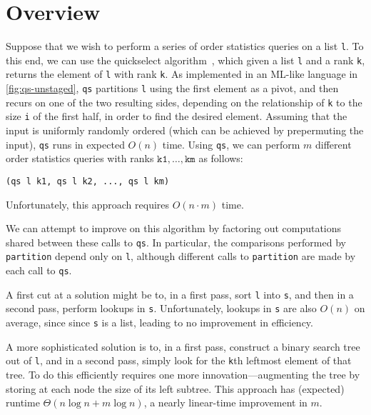 
\section{Overview}
\label{sec:overview}

\begin{abstrsyn}



Suppose that we wish to perform a series of order statistics queries
on a list \texttt{l}. To this end, we can use the quickselect
algorithm~\cite{Hoare:1961}, which given a list \texttt{l} and a rank
\texttt{k}, returns the element of \texttt{l} with rank \texttt{k}.
As implemented in an ML-like language in \ref{fig:qs-unstaged},
\texttt{qs} partitions \texttt{l} using the first element as
a pivot, and then recurs on one of the two resulting sides, depending on
the relationship of \texttt{k} to the size \texttt{i} of the first half, in
order to find the desired element.  Assuming that the input is uniformly
randomly ordered (which can be achieved by prepermuting the input), \texttt{qs}
runs in expected $O(n)$ time.
%
Using \texttt{qs}, we can perform $m$ different order statistics queries with
ranks $\mathtt{k1},\dots,\mathtt{km}$ as follows:
%
\begin{lstlisting}
(qs l k1, qs l k2, ..., qs l km)
\end{lstlisting}
%
Unfortunately, this approach requires $O(n \cdot m)$ time.

We can attempt to improve on this algorithm by factoring out computations shared
between these calls to \texttt{qs}. In particular, the comparisons performed by
\texttt{partition} depend only on \texttt{l}, although different calls to
\texttt{partition} are made by each call to \texttt{qs}.

A first cut at a solution might be to, in a first pass, sort \texttt{l} into
\texttt{s}, and then in a second pass, perform lookups in \texttt{s}.
Unfortunately, lookups in \texttt{s} are also $O(n)$ on average, since since
\texttt{s} is a list, leading to no improvement in efficiency.  

A more sophisticated solution is to, in a first pass, construct a binary search
tree out of \texttt{l}, and in a second pass, simply look for the \texttt{k}th
leftmost element of that tree. To do this efficiently requires one more
innovation---augmenting the tree by storing at each node the size of its left
subtree. This approach has (expected) runtime $\Theta(n\log{n} + m\log{n})$, a
nearly linear-time improvement in $m$.


\end{abstrsyn}
